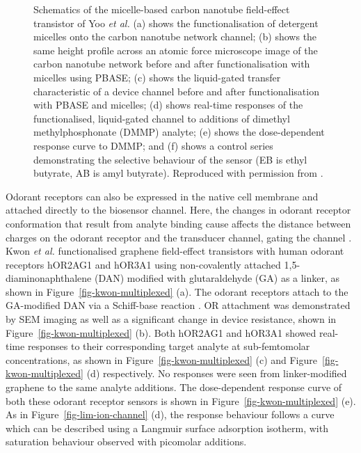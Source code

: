 \documentclass[
  a4paper,
]{scrbook}
\begin{document}
\begin{figure}
\caption{\label{fig-yoo-micelle}Schematics of the micelle-based carbon
nanotube field-effect transistor of Yoo \emph{et al.} (a) shows the
functionalisation of detergent micelles onto the carbon nanotube network
channel; (b) shows the same height profile across an atomic force
microscope image of the carbon nanotube network before and after
functionalisation with micelles using PBASE; (c) shows the liquid-gated
transfer characteristic of a device channel before and after
functionalisation with PBASE and micelles; (d) shows real-time responses
of the functionalised, liquid-gated channel to additions of dimethyl
methylphosphonate (DMMP) analyte; (e) shows the dose-dependent response
curve to DMMP; and (f) shows a control series demonstrating the
selective behaviour of the sensor (EB is ethyl butyrate, AB is amyl
butyrate). Reproduced with permission from \autocite{Yoo2022}.}

\end{figure}

Odorant receptors can also be expressed in the native cell membrane and
attached directly to the biosensor channel. Here, the changes in odorant
receptor conformation that result from analyte binding cause affects the
distance between charges on the odorant receptor and the transducer
channel, gating the channel \autocite{Kwon2015,Dung2018}. Kwon \emph{et
al.} functionalised graphene field-effect transistors with human odorant
receptors hOR2AG1 and hOR3A1 using non-covalently attached
1,5-diaminonaphthalene (DAN) modified with glutaraldehyde (GA) as a
linker, as shown in Figure~\ref{fig-kwon-multiplexed} (a). The odorant
receptors attach to the GA-modified DAN via a Schiff-base reaction
\autocite{Subasi2022}. OR attachment was demonstrated by SEM imaging as
well as a significant change in device resistance, shown in
Figure~\ref{fig-kwon-multiplexed} (b). Both hOR2AG1 and hOR3A1 showed
real-time responses to their corresponding target analyte at
sub-femtomolar concentrations, as shown in
Figure~\ref{fig-kwon-multiplexed} (c) and
Figure~\ref{fig-kwon-multiplexed} (d) respectively. No responses were
seen from linker-modified graphene to the same analyte additions. The
dose-dependent response curve of both these odorant receptor sensors is
shown in Figure~\ref{fig-kwon-multiplexed} (e). As in
Figure~\ref{fig-lim-ion-channel} (d), the response behaviour follows a
curve which can be described using a Langmuir surface adsorption
isotherm, with saturation behaviour observed with picomolar additions.
\end{document}
